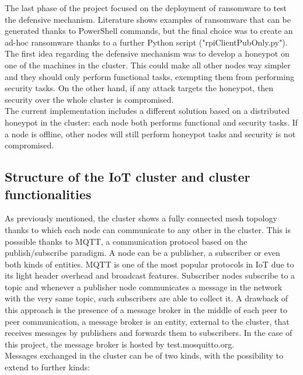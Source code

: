 The last phase of the project focused on the deployment of ransomware to test the defensive mechanism. Literature shows examples of ransomware that can be generated thanks to PowerShell commands, but the final choice was to create an ad-hoc ransomware thanks to a further Python script ("rpiClientPubOnly.py").\\
The first idea regarding the defensive mechanism was to develop a honeypot on one of the machines in the cluster. This could make all other nodes way simpler and they should only perform functional tasks, exempting them from performing security tasks. On the other hand, if any attack targets the honeypot, then security over the whole cluster is compromised.\\
The current implementation includes a different solution based on a distributed honeypot in the cluster: each node both performs functional and security tasks. If a node is offline, other nodes will still perform honeypot tasks and security is not compromised.

\subsection{Structure of the IoT cluster and cluster functionalities}

As previously mentioned,
 the cluster shows a fully connected mesh topology thanks to which each node can communicate to any other in the cluster. This is posssible thanks to MQTT, a communication protocol based on the publish/subscribe paradigm. A node can be a publisher, a subscriber or even both kinds of entities. MQTT is one of the most popular protocols in IoT due to its light header overhead and broadcast features. Subscriber nodes subscribe to a topic and whenever a publisher node communicates a message in the network with the very same topic, such subscribers are able to collect it. A drawback of this approach is the presence of a message broker in the middle of each peer to peer communication, a message broker is an entity, external to the cluster, that receives messages by publishers and forwards them to subscribers. In the case of this project, the message broker is hosted by test.mosquitto.org.
\\
Messages exchanged in the cluster can be of two kinds, with the possibility to extend to further kinds:

